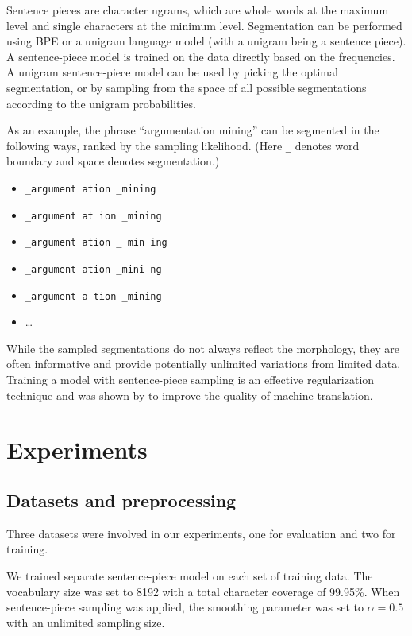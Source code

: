 \documentclass[11pt]{article}
\begin{document}
Sentence pieces are character ngrams,
which are whole words at the maximum level and single characters at the minimum level.
Segmentation can be performed using BPE or a unigram language model
(with a unigram being a sentence piece).
A sentence-piece model is trained on the data directly based on the frequencies.
A unigram sentence-piece model can be used by picking the optimal segmentation,
or by sampling from the space of all possible segmentations according to the unigram probabilities.

As an example, the phrase ``argumentation mining'' can be segmented in the following ways,
ranked by the sampling likelihood.
(Here \texttt{\_} denotes word boundary and space denotes segmentation.)

\begin{itemize}
  \item \texttt{\_argument ation \_mining}
  \item \texttt{\_argument at ion \_mining}
  \item \texttt{\_argument ation \_ min ing}
  \item \texttt{\_argument ation \_mini ng}
  \item \texttt{\_argument a tion \_mining}
  \item \dots
\end{itemize}

While the sampled segmentations do not always reflect the morphology,
they are often informative and provide potentially unlimited variations from limited data.
Training a model with sentence-piece sampling is an effective regularization technique
and was shown by \textcite{kudo2018subword} to improve the quality of machine translation.

\section{Experiments}\label{sec:experiments}

\subsection{Datasets and preprocessing}\label{sec:datas-prepr}

Three datasets were involved in our experiments,
one for evaluation and two for training.

We trained separate sentence-piece model on each set of training data.
The vocabulary size was set to 8192 with a total character coverage of 99.95\%.
When sentence-piece sampling was applied,
the smoothing parameter was set to \(\alpha = 0.5\) with an unlimited sampling size.
\end{document}
